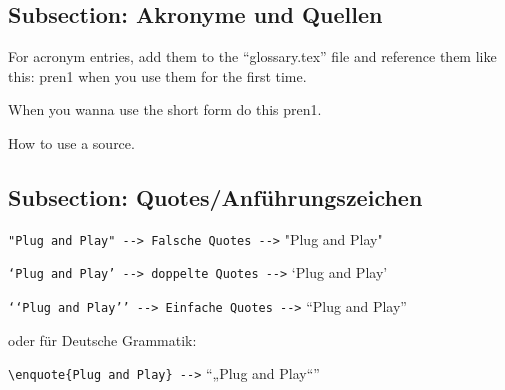 \subsection{Subsection: Akronyme und Quellen}

For acronym entries, add them to the ``glossary.tex'' file and reference them like this: \acrfull{pren1} when you use them for the first time.

When you wanna use the short form do this \acrshort{pren1}.

How to use a source\cite{wikipedia-scrum}.

\subsection{Subsection: Quotes/Anführungszeichen}

\verb|"Plug and Play" --> Falsche Quotes -->| "Plug and Play"

\verb|‘Plug and Play’ --> doppelte Quotes -->| ‘Plug and Play’

\verb|‘‘Plug and Play’’ --> Einfache Quotes -->| “Plug and Play”

oder für Deutsche Grammatik:

\verb|\enquote{Plug and Play} -->| \enquote{„Plug and Play“}
